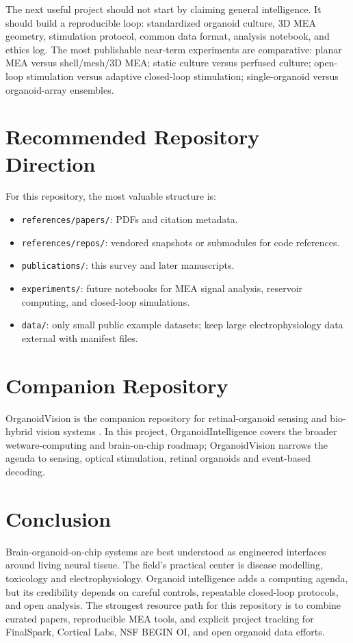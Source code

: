 \documentclass[10pt,twocolumn]{article}
\begin{document}
The next useful project should not start by claiming general intelligence. It should build a reproducible loop: standardized organoid culture, 3D MEA geometry, stimulation protocol, common data format, analysis notebook, and ethics log. The most publishable near-term experiments are comparative: planar MEA versus shell/mesh/3D MEA; static culture versus perfused culture; open-loop stimulation versus adaptive closed-loop stimulation; single-organoid versus organoid-array ensembles.

\section{Recommended Repository Direction}

For this repository, the most valuable structure is:
\begin{itemize}
\item \texttt{references/papers/}: PDFs and citation metadata.
\item \texttt{references/repos/}: vendored snapshots or submodules for code references.
\item \texttt{publications/}: this survey and later manuscripts.
\item \texttt{experiments/}: future notebooks for MEA signal analysis, reservoir computing, and closed-loop simulations.
\item \texttt{data/}: only small public example datasets; keep large electrophysiology data external with manifest files.
\end{itemize}

\section{Companion Repository}

OrganoidVision is the companion repository for retinal-organoid sensing and bio-hybrid vision systems \cite{organoidvision2026}. In this project, OrganoidIntelligence covers the broader wetware-computing and brain-on-chip roadmap; OrganoidVision narrows the agenda to sensing, optical stimulation, retinal organoids and event-based decoding.

\section{Conclusion}

Brain-organoid-on-chip systems are best understood as engineered interfaces around living neural tissue. The field's practical center is disease modelling, toxicology and electrophysiology. Organoid intelligence adds a computing agenda, but its credibility depends on careful controls, repeatable closed-loop protocols, and open analysis. The strongest resource path for this repository is to combine curated papers, reproducible MEA tools, and explicit project tracking for FinalSpark, Cortical Labs, NSF BEGIN OI, and open organoid data efforts.
\end{document}
